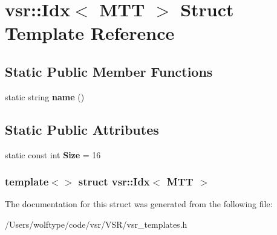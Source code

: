 \hypertarget{structvsr_1_1_idx_3_01_m_t_t_01_4}{\section{vsr\-:\-:Idx$<$ M\-T\-T $>$ Struct Template Reference}
\label{structvsr_1_1_idx_3_01_m_t_t_01_4}
}
\subsection*{Static Public Member Functions}
\begin{DoxyCompactItemize}
\item 
\hypertarget{structvsr_1_1_idx_3_01_m_t_t_01_4_ad0136ec4f82281e3251d09164c161be3}{static string {\bfseries name} ()}\label{structvsr_1_1_idx_3_01_m_t_t_01_4_ad0136ec4f82281e3251d09164c161be3}

\end{DoxyCompactItemize}
\subsection*{Static Public Attributes}
\begin{DoxyCompactItemize}
\item 
\hypertarget{structvsr_1_1_idx_3_01_m_t_t_01_4_afe5239df0f8fff54f3175c2e4448e6ed}{static const int {\bfseries Size} = 16}\label{structvsr_1_1_idx_3_01_m_t_t_01_4_afe5239df0f8fff54f3175c2e4448e6ed}

\end{DoxyCompactItemize}
\subsubsection*{template$<$$>$ struct vsr\-::\-Idx$<$ M\-T\-T $>$}



The documentation for this struct was generated from the following file\-:\begin{DoxyCompactItemize}
\item 
/\-Users/wolftype/code/vsr/\-V\-S\-R/vsr\-\_\-templates.\-h\end{DoxyCompactItemize}
